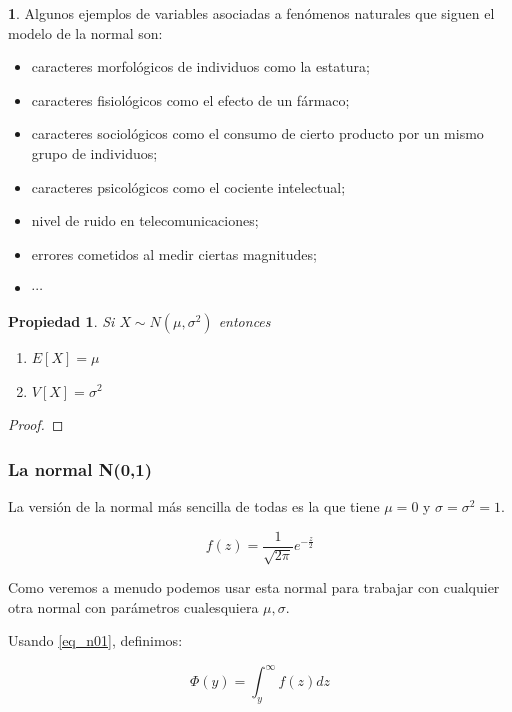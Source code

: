 \documentclass[]{book}
\theoremstyle{plain}
\newtheorem{property}[theorem]{Propiedad}
\theoremstyle{definition}
\theoremstyle{definition} %
\newcommand{\thistheoremname}{}
\newtheorem{genericthm}[theorem]{\thistheoremname}
\newenvironment{customdef}[1]
  {\renewcommand{\thistheoremname}{#1}%
   \begin{genericthm}}
  {\end{genericthm}}
\begin{document}
\begin{customdef}{Aplicaciones de la Normal}
Algunos ejemplos de variables asociadas a fenómenos naturales que siguen
el modelo de la normal son:

\begin{itemize}
\item
  caracteres morfológicos de individuos como la estatura;
\item
  caracteres fisiológicos como el efecto de un fármaco;
\item
  caracteres sociológicos como el consumo de cierto producto por un
  mismo grupo de individuos;
\item
  caracteres psicológicos como el cociente intelectual;
\item
  nivel de ruido en telecomunicaciones;
\item
  errores cometidos al medir ciertas magnitudes;
  \item $\cdots$
\end{itemize}
\end{customdef}

\begin{property}
  Si $X \sim  N(\mu, \sigma^2)$ entonces 
  \begin{enumerate}
    \item $E[X] = \mu$
    \item $V[X] = \sigma^2$
  \end{enumerate}
\end{property}

\begin{proof}
   
\end{proof}

\subsubsection*{La normal N(0,1)}

La versión de la normal más sencilla de todas es la que tiene $\mu=0$ y $\sigma = \sigma^2 = 1$.

\begin{equation}\label{eq_n01}
  f(z) = \frac{1}{\sqrt{2\pi}} e^{-\frac{z}{2}}
\end{equation}
  
Como veremos a menudo podemos usar esta normal para trabajar con cualquier otra normal con parámetros cualesquiera $\mu, \sigma$.

Usando \ref{eq_n01}, definimos:

\begin{equation}\label{eq_phi_norm}
  \Phi(y) = \int^{\infty}_{y} f(z)dz
\end{equation}
 
\end{document}
